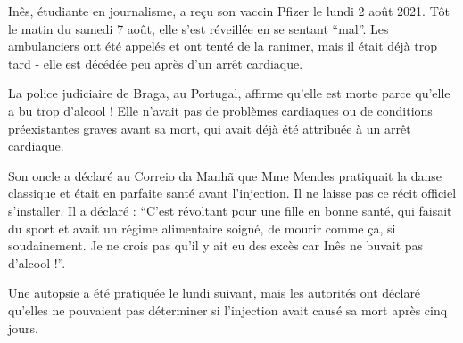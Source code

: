 Inês, étudiante en journalisme, a reçu son vaccin Pfizer le lundi 2 août
2021. Tôt le matin du samedi 7 août, elle s'est réveillée en se sentant
“mal”. Les ambulanciers ont été appelés et ont tenté de la ranimer, mais il
était déjà trop tard - elle est décédée peu après d'un arrêt cardiaque.

La police judiciaire de Braga, au Portugal, affirme qu'elle est morte parce
qu'elle a bu trop d'alcool ! Elle n'avait pas de problèmes cardiaques ou de
conditions préexistantes graves avant sa mort, qui avait déjà été attribuée à un
arrêt cardiaque.

Son oncle a déclaré au Correio da Manhã que Mme Mendes pratiquait la danse
classique et était en parfaite santé avant l'injection. Il ne laisse pas ce
récit officiel s'installer. Il a déclaré : “C'est révoltant pour une fille en
bonne santé, qui faisait du sport et avait un régime alimentaire soigné, de
mourir comme ça, si soudainement. Je ne crois pas qu'il y ait eu des excès car
Inês ne buvait pas d'alcool !”.

Une autopsie a été pratiquée le lundi suivant, mais les autorités ont déclaré
qu'elles ne pouvaient pas déterminer si l'injection avait causé sa mort après
cinq jours.

